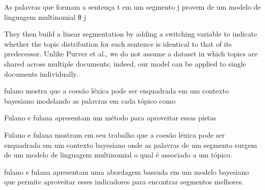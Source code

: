 



{As palavras que formam a sentença t em um segmento j provem de um modelo de linguagem multinomial θ j}




They then build a linear segmentation by adding a switching variable to indicate whether the topic distribution for each sentence is identical to that of its predecessor. Unlike Purver et al., we do not assume a dataset in which topics are shared across multiple documents; indeed, our model can be applied to single documents individually.

fulano mostra que a coesão léxica pode ser enquadrada em um contexto bayesiano modelando as palavras em cada tópico como 











Fulano e fulana apresentam um método para aproveitar essas pistas





Fulano e fulana mostram em seu trabalho que a coesão léxica pode ser enquadrada em um contexto bayesiano onde as palavras de um segmento surgem de um modelo de linguagem multinomial o qual é associado a um tópico.





fulano e fulana apresentam uma abordagem baseada em um modelo bayesiano que permite aproveitar esses indicadores para encontrar segmentos melhores.

